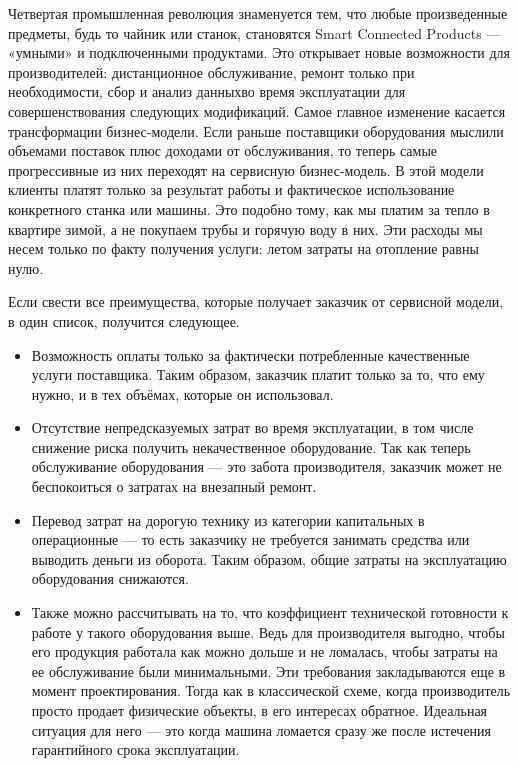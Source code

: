 \label{sec:intro}

Четвертая промышленная революция знаменуется тем, что любые произведенные предметы, будь то чайник или станок, становятся Smart Connected Products — «умными» и подключенными продуктами.
Это открывает новые возможности для производителей: дистанционное обслуживание, ремонт только при необходимости, сбор и анализ данныхво время эксплуатации для совершенствования следующих модификаций.
Самое главное изменение касается трансформации бизнес-модели. Если раньше поставщики оборудования мыслили объемами поставок плюс доходами от обслуживания, то теперь самые прогрессивные из них переходят на сервисную бизнес-модель.
В этой модели клиенты платят только за результат работы и фактическое использование конкретного станка или машины.
Это подобно тому, как мы платим за тепло в квартире зимой, а не покупаем трубы и горячую воду в них.
Эти расходы мы несем только по факту получения услуги: летом затраты на отопление равны нулю.

Если свести все преимущества, которые получает заказчик от сервисной модели, в один список, получится следующее.

\begin{itemize}
    \item Возможность оплаты только за фактически потребленные качественные услуги поставщика.
    Таким образом, заказчик платит только за то, что ему нужно, и в тех объёмах, которые он использовал.
    \item Отсутствие непредсказуемых затрат во время эксплуатации, в том числе снижение риска получить некачественное оборудование.
    Так как теперь обслуживание оборудования — это забота производителя, заказчик может не беспокоиться о затратах на внезапный ремонт.
    \item Перевод затрат на дорогую технику из категории капитальных в операционные — то есть заказчику не требуется занимать средства или выводить деньги из оборота.
    Таким образом, общие затраты на эксплуатацию оборудования снижаются.
    \item Также можно рассчитывать на то, что коэффициент технической готовности к работе у такого оборудования выше.
    Ведь для производителя выгодно, чтобы его продукция работала как можно дольше и не ломалась, чтобы затраты на ее обслуживание были минимальными.
    Эти требования закладываются еще в момент проектирования.
    Тогда как в классической схеме, когда производитель просто продает физические объекты, в его интересах обратное.
    Идеальная ситуация для него — это когда машина ломается сразу же после истечения гарантийного срока эксплуатации.
    \end{itemize}

